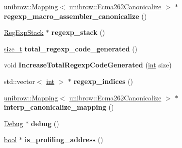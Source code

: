 \begin{DoxyCompactItemize}
\mbox{\label{classv8_1_1internal_1_1Isolate_ac2eb3ba336b107b317155072ed447f1b}} 
\mbox{\hyperlink{classunibrow_1_1Mapping}{unibrow\+::\+Mapping}}$<$ \mbox{\hyperlink{structunibrow_1_1Ecma262Canonicalize}{unibrow\+::\+Ecma262\+Canonicalize}} $>$ $\ast$ {\bfseries regexp\+\_\+macro\+\_\+assembler\+\_\+canonicalize} ()
\item 
\mbox{\label{classv8_1_1internal_1_1Isolate_a93ba4595a63e17be7f29ccd1d5231ee7}} 
\mbox{\hyperlink{classv8_1_1internal_1_1RegExpStack}{Reg\+Exp\+Stack}} $\ast$ {\bfseries regexp\+\_\+stack} ()
\item 
\mbox{\label{classv8_1_1internal_1_1Isolate_aebea0bfb6c0936c0f653acaef8f1b5ef}} 
\mbox{\hyperlink{classsize__t}{size\+\_\+t}} {\bfseries total\+\_\+regexp\+\_\+code\+\_\+generated} ()
\item 
\mbox{\label{classv8_1_1internal_1_1Isolate_a65c4d5c234115dc55d7484c52851d752}} 
void {\bfseries Increase\+Total\+Regexp\+Code\+Generated} (\mbox{\hyperlink{classint}{int}} size)
\item 
\mbox{\label{classv8_1_1internal_1_1Isolate_a1524641c5af3e86621badb65e92a683a}} 
std\+::vector$<$ \mbox{\hyperlink{classint}{int}} $>$ $\ast$ {\bfseries regexp\+\_\+indices} ()
\item 
\mbox{\label{classv8_1_1internal_1_1Isolate_ab3d2c09b64fcc90f1320c6b368f9e3f1}} 
\mbox{\hyperlink{classunibrow_1_1Mapping}{unibrow\+::\+Mapping}}$<$ \mbox{\hyperlink{structunibrow_1_1Ecma262Canonicalize}{unibrow\+::\+Ecma262\+Canonicalize}} $>$ $\ast$ {\bfseries interp\+\_\+canonicalize\+\_\+mapping} ()
\item 
\mbox{\label{classv8_1_1internal_1_1Isolate_a5dd8bb2f8e59eea510c69a2062c5032e}} 
\mbox{\hyperlink{classv8_1_1internal_1_1Debug}{Debug}} $\ast$ {\bfseries debug} ()
\item 
\mbox{\label{classv8_1_1internal_1_1Isolate_a86df23fc1dcca792f597bb0ebdbc504d}} 
\mbox{\hyperlink{classbool}{bool}} $\ast$ {\bfseries is\+\_\+profiling\+\_\+address} ()

\end{DoxyCompactItemize}
